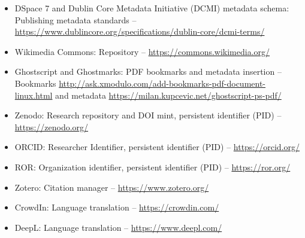 \documentclass{article}
\begin{document}
\begin{itemize}
\item DSpace 7 and Dublin Core Metadata Initiative (DCMI) metadata schema: Publishing metadata standards – \href{https://www.dublincore.org/specifications/dublin-core/dcmi-terms/}{https://www.dublincore.org/specifications/dublin-core/dcmi-terms/}


\item Wikimedia Commons: Repository – \href{https://commons.wikimedia.org/}{https://commons.wikimedia.org/}


\item Ghostscript and Ghostmarks: PDF bookmarks and metadata insertion – Bookmarks \href{http://ask.xmodulo.com/add-bookmarks-pdf-document-linux.html}{http://ask.xmodulo.com/add-bookmarks-pdf-document-linux.html} and metadata \href{https://milan.kupcevic.net/ghostscript-ps-pdf/}{https://milan.kupcevic.net/ghostscript-ps-pdf/} 


\item Zenodo: Research repository and DOI mint, persistent identifier (PID) – \href{https://zenodo.org/}{https://zenodo.org/}


\item ORCID: Researcher Identifier, persistent identifier (PID) – \href{https://orcid.org/}{https://orcid.org/}


\item ROR: Organization identifier, persistent identifier (PID) – \href{https://ror.org/ }{https://ror.org/ }


\item Zotero: Citation manager – \href{https://www.zotero.org/}{https://www.zotero.org/}


\item CrowdIn: Language translation – \href{https://crowdin.com/}{https://crowdin.com/}


\item DeepL: Language translation – \href{https://www.deepl.com/}{https://www.deepl.com/}


\end{itemize}
\end{document}
